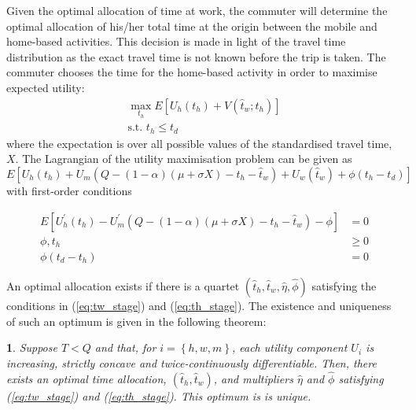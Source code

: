 \documentclass[12pt,a4paper,british]{article}
\theoremstyle{definition}
\theoremstyle{plain}
\newtheorem{thm}{\protect\theoremname}
\theoremstyle{plain}
\providecommand{\theoremname}{Theorem}
\begin{document}
Given the optimal allocation of time at work, the commuter will determine the optimal allocation of his/her total time at the origin between the mobile and home-based activities. This decision is made in light of the travel time distribution as the exact travel time is not known before the trip is taken. The commuter chooses the time for the home-based activity in order to maximise expected utility:
\begin{gather*}
\max_{t_{h}}E\left[U_{h}\left(t_{h}\right)+V\left(\hat{t}_{w};t_{h}\right)\right]\\
\mbox{s.t. }t_{h}\leq t_{d}
\end{gather*}
where the expectation is over all possible values of the standardised travel time, $X$. The Lagrangian of the utility maximisation problem can be given as 
\begin{equation*}
E\left[U_{h}\left(t_{h}\right)+U_{m}\left(Q-\left(1-\alpha\right)\left(\mu+\sigma X\right)-t_{h}-\hat{t}_{w}\right)+U_{w}\left(\hat{t}_{w}\right)+\phi\left(t_{h}-t_{d}\right)\right]
\end{equation*}
with first-order conditions

\begin{subequations}\label{eq:th_stage}
\begin{align}
E\left[U_{h}^{\prime}\left(t_{h}\right)-U_{m}^{\prime}\left(Q-\left(1-\alpha\right)\left(\mu+\sigma X\right)-t_{h}-\hat{t}_{w}\right)-\phi\right] & =0\label{eq:stage1_wrt_th}\\
\phi,t_{h} & \geq0\label{eq:stage1_lambda}\\
\phi\left(t_{d}-t_{h}\right) & =0\label{eq:stage1_lambdai_const}
\end{align}
\end{subequations}

An optimal allocation exists if there is a quartet $\left(\hat{t}_{h},\hat{t}_{w},\hat{\eta},\hat{\phi}\right)$ satisfying the conditions in (\ref{eq:tw_stage}) and (\ref{eq:th_stage}). The existence and uniqueness of such an optimum is given in the following theorem:
\begin{thm}
\label{thm:existence_stochastic}Suppose $T<Q$ and that, for $i=\left\{ h,w,m\right\} $, each utility component $U_{i}$ is increasing, strictly concave and twice-continuously differentiable. Then, there exists an optimal time allocation, $\left(\hat{t}_{h},\hat{t}_{w}\right)$, and multipliers $\hat{\eta}$ and $\hat{\phi}$ satisfying (\ref{eq:tw_stage}) and (\ref{eq:th_stage}). This optimum is is unique.
\end{thm}
\end{document}
